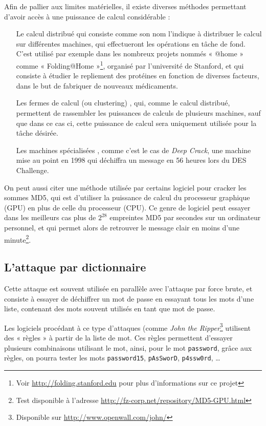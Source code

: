Afin de pallier aux limites matérielles, il existe diverses
méthodes permettant d'avoir accès à une puissance de
calcul considérable :
\begin{itemize}
  \renewcommand{\makelabel}[1]{\sffamily\textbf{#1}}
  \item[Le calcul distribué] qui consiste comme son nom l'indique
à distribuer le calcul sur différentes machines, qui effectueront
les opérations en tâche de fond. C'est utilisé par exemple dans
les nombreux projets nommés « @home » comme « Folding@Home
»\footnote{Voir \url{http://folding.stanford.edu} pour plus
d'informations sur ce projet},
organisé par l'université de Stanford, et qui consiste à étudier
le repliement des protéines en fonction de diverses facteurs, dans
le but de fabriquer de nouveaux médicaments.
  \item[Les fermes de calcul (ou clustering)], qui, comme le
calcul distribué, permettent de rassembler les puissances de
calculs de plusieurs machines, sauf que dans ce cas ci, cette
puissance de calcul sera uniquement utilisée pour la tâche
désirée.
  \item[Les machines spécialisées], comme c'est le cas de
\emph{Deep Crack}, une machine mise au point en 1998 qui déchiffra
un message en 56 heures lors du DES Challenge.\\
\end{itemize}

On peut aussi citer une méthode utilisée par certains logiciel pour
cracker les sommes MD5, qui est d'utiliser la
puissance de calcul du processeur graphique (GPU) en plus de celle
du processeur (CPU). Ce genre de logiciel peut essayer dans les
meilleurs cas plus de
$2^{28}$ empreintes MD5 par secondes sur un ordinateur 
personnel, et qui permet alors de retrouver le message clair en
moins d'une minute\footnote{Test disponible à l'adresse
\url{http://fz-corp.net/repository/MD5-GPU.html}}.

\subsection{L'attaque par dictionnaire}
Cette attaque est souvent utilisée en parallèle avec l'attaque par
force brute, et consiste à essayer de déchiffrer un mot de passe
en essayant tous les mots d'une liste, contenant des mots souvent
utilisés en tant que mot de passe.

Les logiciels procédant à ce type d'attaques (comme \emph{John the
Ripper}\footnote{Disponible sur
\url{http://www.openwall.com/john/}} utilisent des « règles » à
partir de la liste de mot. Ces règles permettent d'essayer
plusieurs combinaisons utilisant le mot, ainsi, pour le mot
\texttt{password}, grâce aux règles, on pourra tester les mots
\texttt{password15}, \texttt{pAsSworD}, \texttt{p4ssw0rd}, \dots

